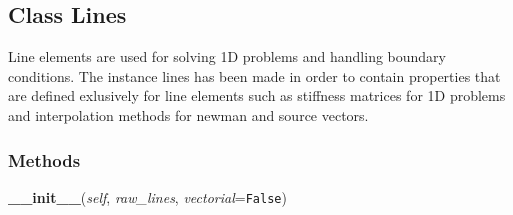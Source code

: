 

\subsection{Class Lines}

    \label{Classes:Lines}
Line elements are used for solving 1D problems and handling boundary 
conditions. The instance lines has been made in order to contain properties
that are defined exlusively for line elements such as stiffness matrices 
for 1D problems and interpolation methods for newman and source vectors.



  \subsubsection{Methods}

    \label{Classes:Lines:__init__}

    \vspace{0.5ex}

\hspace{.8\funcindent}\begin{boxedminipage}{\funcwidth}

    \raggedright \textbf{\_\_init\_\_}(\textit{self}, \textit{raw\_lines}, \textit{vectorial}={\tt False})

\setlength{\parskip}{2ex}
\setlength{\parskip}{1ex}
    \end{boxedminipage}

    \label{Classes:Lines:extract_el_points}

    \vspace{0.5ex}


